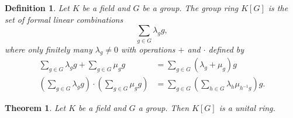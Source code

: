 \documentclass[titlepage, a4paper]{article}
\newtheorem{theorem}{Theorem}
\newtheorem{definition}{Definition}
\theoremstyle{remark}
\begin{document}
\begin{definition}\label{def:group_ring}
    Let $K$ be a field and $G$ be a group. The group ring $K[G]$ is the set of formal linear combinations
    \[
        \sum_{g \in G} \lambda_g g,
    \]
    where only finitely many $\lambda_g \neq 0$ with operations $+$ and $\cdot$ defined by
    \begin{align*}
        \sum_{g \in G} \lambda_g g + \sum_{g \in G} \mu_g g
        &= \sum_{g \in G} (\lambda_g+\mu_g) g \\
        \left(\sum_{g \in G} \lambda_g g \right) \cdot \left(\sum_{g \in G} \mu_g g \right)
        &= \sum_{g \in G} \left( \sum_{h \in G} \lambda_{h} \mu_{h^{-1}g} \right) g.
    \end{align*}
\end{definition}


\begin{theorem}
    Let $K$ be a field and $G$ a group. Then $K[G]$ is a unital ring.
\end{theorem}
\end{document}
